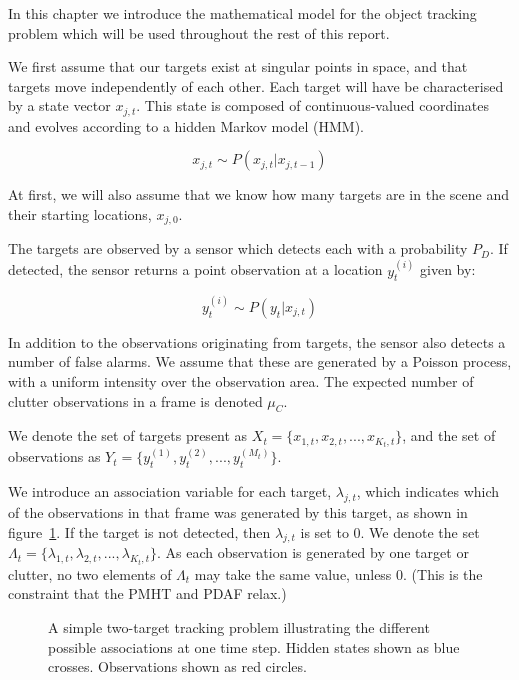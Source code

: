 In this chapter we introduce the mathematical model for the object tracking problem which will be used throughout the rest of this report.

We first assume that our targets exist at singular points in space, and that targets move independently of each other. Each target will have be characterised by a state vector $x_{j,t}$. This state is composed of continuous-valued coordinates and evolves according to a hidden Markov model (HMM).

\begin{equation}
x_{j,t} \sim P(x_{j,t}|x_{j,t-1})
\end{equation}

At first, we will also assume that we know how many targets are in the scene and their starting locations, $x_{j,0}$.

The targets are observed by a sensor which detects each with a probability $P_D$. If detected, the sensor returns a point observation at a location $y_t^{(i)}$ given by:

\begin{equation}
y_t^{(i)} \sim P(y_t|x_{j,t})
\end{equation}

In addition to the observations originating from targets, the sensor also detects a number of false alarms. We assume that these are generated by a Poisson process, with a uniform intensity over the observation area. The expected number of clutter observations in a frame is denoted $\mu_C$.

We denote the set of targets present as $X_t = \{x_{1,t}, x_{2,t}, ... , x_{K_t, t} \}$, and the set of observations as $Y_t = \{y_t^{(1)}, y_t^{(2)}, ... , y_t^{(M_t)} \}$.

We introduce an association variable for each target, $\lambda_{j,t}$, which indicates which of the observations in that frame was generated by this target, as shown in figure~\ref{fig:BasicTrackingAssoc}. If the target is not detected, then $\lambda_{j,t}$ is set to 0. We denote the set $\Lambda_t = \{\lambda_{1,t}, \lambda_{2,t}, ... , \lambda_{K_t, t} \}$. As each observation is generated by one target or clutter, no two elements of $\Lambda_t$ may take the same value, unless 0. (This is the constraint that the PMHT and PDAF relax.)

\begin{figure} \centering
%
\caption{A simple two-target tracking problem illustrating the different possible associations at one time step. Hidden states shown as blue crosses. Observations shown as red circles.}
\label{fig:BasicTrackingAssoc}%
\end{figure}

